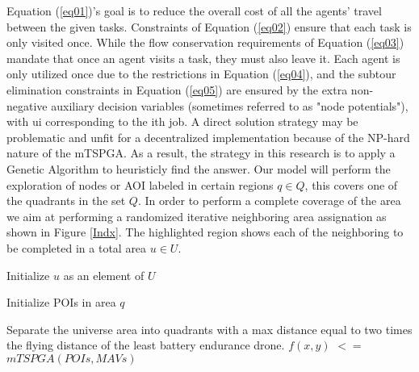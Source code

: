 \documentclass[preprint,review, 11pt,3p,authoryear]{elsarticle}
\begin{document}
{%
 




Equation (\ref{eq01})'s goal is to reduce the overall cost of all the agents' travel between the given tasks. Constraints of Equation (\ref{eq02}) ensure that each task is only visited once. While the flow conservation requirements of Equation (\ref{eq03}) mandate that once an agent visits a task, they must also leave it.  Each agent is only utilized once due to the restrictions in Equation (\ref{eq04}), and the subtour elimination constraints in Equation (\ref{eq05}) are ensured by the extra non-negative auxiliary decision variables (sometimes referred to as "node potentials"), with ui corresponding to the ith job. A direct solution strategy may be problematic and unfit for a decentralized implementation because of the NP-hard nature of the mTSPGA. As a result, the strategy in this research is to apply a Genetic Algorithm to heuristicly find the answer. Our model will perform the exploration of nodes or AOI labeled in certain regions $q \in Q$, this covers one of the quadrants in the set $Q$. In order to perform a complete coverage of the area we aim at performing a randomized iterative neighboring area assignation as shown in Figure \ref{Indx}. The highlighted region shows each of the neighboring to be completed in a total area $u \in U$. \\ 



\begin{algorithm}
\color{black}
\begin{algorithmic}
\STATE Initialize $u$ as an element of $U$
  
  \STATE Initialize POIs in area $q$ 
  
  \STATE Separate the universe area into quadrants with a max distance equal to two times the flying distance of the least battery endurance drone. 
  \STATE $f(x,y)$ $<=$ $mTSPGA(POIs,MAVs)$
  

\end{algorithmic}
\end{algorithm}}
\end{document}
